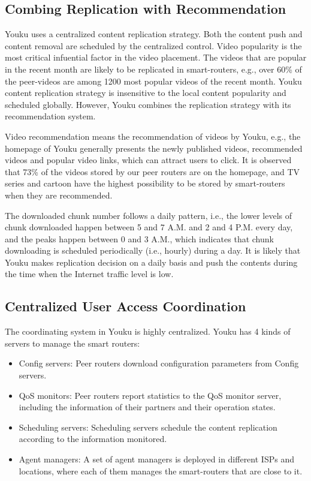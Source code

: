 \subsection{Combing Replication with Recommendation}
\label{subsection_1}
Youku uses a centralized content replication strategy. Both the content push and content
removal are scheduled by the centralized control. Video popularity is the most critical
infuential factor in the video placement. The videos that are popular in the recent month are
likely to be replicated in smart-routers, e.g., over 60\% of the peer-videos are among 1200 most
popular videos of the recent month. Youku content replication strategy is insensitive to the
local content popularity and scheduled globally. However, Youku combines the replication
strategy with its recommendation system.

Video recommendation means the recommendation of videos by Youku, e.g., the homepage
 of Youku generally presents the newly published videos, recommended videos and popular
 video links, which can attract users to click. It is observed that 73\% of the videos
stored by our peer routers are on the homepage, and TV series and cartoon have the highest
possibility to be stored by smart-routers when they are recommended.

The downloaded chunk number follows a daily pattern, i.e., the lower levels of chunk
downloaded happen between 5 and 7 A.M. and 2 and 4 P.M. every day, and the peaks happen
between 0 and 3 A.M., which indicates that chunk downloading is scheduled periodically (i.e.,
hourly) during a day. It is likely that Youku makes replication decision on a daily basis and
push the contents during the time when the Internet traffic level is low.

\subsection{Centralized User Access Coordination}
\label{subsection_2}

The coordinating system in Youku is highly centralized. Youku has 4 kinds of servers to
manage the smart routers:
\begin{itemize}
	\item Config servers: Peer routers download configuration parameters from Config servers.
  \item QoS monitors: Peer routers report statistics to the QoS monitor server, including the
information of their partners and their operation states.
  \item Scheduling servers: Scheduling servers schedule the content replication according to the
information monitored.
  \item Agent managers: A set of agent managers is deployed in different ISPs and locations,
where each of them manages the smart-routers that are close to it.
\end{itemize}

